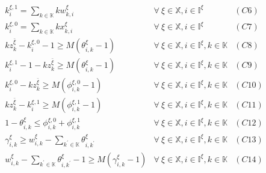 \documentclass[]{interact}
\theoremstyle{plain}%
\theoremstyle{definition}
\theoremstyle{remark}
\begin{document}
\begin{eqnarray}
k^{\xi,1}_i = \sum_{k\in \mathbb{K}}kw^{\xi}_{k,i}& \forall\ \xi\in \mathbb{X},i\in \mathbb{I}^{\xi}&(C6)\nonumber\\
k^{\xi,0}_i = \sum_{k\in \mathbb{K}}kx^{\xi}_{k,i}& \forall\ \xi\in \mathbb{X},i\in \mathbb{I}^{\xi}&(C7)\nonumber\\
kz^{\bar{\xi}}_k -k^{\xi,0}_i - 1 \ge M(\theta^{\xi}_{i,k}-1)& \forall\ \xi\in \mathbb{X},i\in \mathbb{I}^{\xi},k\in \mathbb{K}&(C8)\nonumber\\
k^{\xi,1}_i - 1 - kz^{\bar{\xi}}_k \ge M(\theta^{\xi}_{i,k}-1)& \forall\ \xi\in \mathbb{X},i\in \mathbb{I}^{\xi},k\in \mathbb{K}&(C9)\nonumber\\
k^{\xi,0}_i - kz^{\bar{\xi}}_k \ge M(\phi^{\xi,0}_{i,k}-1)&\forall\ \xi\in \mathbb{X},i\in \mathbb{I}^{\xi},k\in \mathbb{K}&(C10)\nonumber\\
kz^{\bar{\xi}}_k - k^{\xi,1}_i \ge M(\phi^{\xi,1}_{i,k}-1)&\forall\ \xi\in \mathbb{X},i\in \mathbb{I}^{\xi},k\in \mathbb{K}&(C11)\nonumber\\
1-\theta^{\xi}_{i,k} \le \phi^{\xi,0}_{i,k} + \phi^{\xi,1}_{i,k}&\forall\ \xi\in \mathbb{X},i\in \mathbb{I}^{\xi},k\in \mathbb{K}&(C12)\nonumber\\
\gamma^{\xi}_{i,k} \ge w^{\xi}_{i,k} - \sum_{k^{'}\in \mathbb{K}}\theta^{\xi}_{i,k^{'}}&\forall\ \xi\in \mathbb{X},i\in \mathbb{I}^{\xi},k\in \mathbb{K}&(C13)\nonumber\\
w^{\xi}_{i,k} - \sum_{k^{'}\in \mathbb{K}}\theta^{\xi}_{i,k^{'}} -1 \ge M(\gamma^{\xi}_{i,k}-1) &\forall\ \xi\in \mathbb{X},i\in \mathbb{I}^{\xi},k\in \mathbb{K}&(C14)\nonumber
\end{eqnarray}
\end{document}
